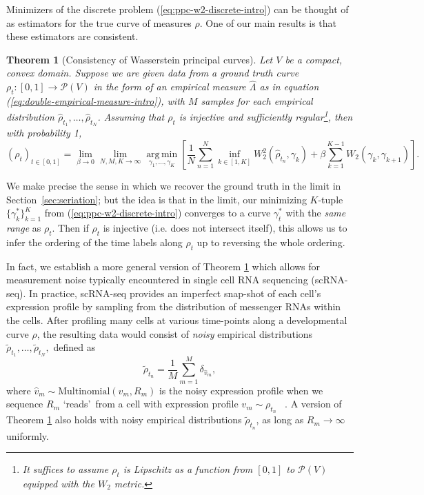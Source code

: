 \documentclass[aos, preprint]{imsart}
\theoremstyle{plain}
\newtheorem{theorem}{Theorem}[section]
\theoremstyle{remark}
\DeclareMathOperator*{\argmin}{arg\,min}
\begin{document}
Minimizers of the discrete problem (\ref{eq:ppc-w2-discrete-intro}) can be thought of as estimators for the true curve of measures $\rho$.
One of our main results is that these estimators are consistent.
\begin{theorem}[Consistency of Wasserstein principal curves]
\label{thm:main-intro}
Let $V$ be a compact, convex domain. Suppose we are given data from a ground truth curve $\rho_t:[0,1]\rightarrow \mathcal{P}(V)$ in the form of an empirical measure $\hat{\Lambda}$ as in equation (\ref{eq:double-empirical-measure-intro}), with $M$ samples for each empirical distribution $\hat \rho_{t_1},\ldots,\hat\rho_{t_N}$. Assuming that $\rho_t$ is injective and sufficiently regular\footnote{It suffices to assume $\rho_t$ is Lipschitz as a function from $[0,1]$ to $\mathcal{P}(V)$ equipped with the $W_2$ metric.}, then with probability 1,
\[
(\rho_t)_{t\in[0,1]}=\lim_{\beta\rightarrow 0}
\lim_{N,M,K \to \infty}\underset{\gamma_1,\ldots,\gamma_K}{\argmin}
\left[\frac{1}{N}\sum_{n=1}^N\inf_{k\in[1,K]}W_2^{2}(\hat{\rho}_{t_n},\gamma_{k})+\beta\sum_{k=1}^{K-1}{W_2}(\gamma_{k},\gamma_{k+1})\right].
\]
\end{theorem}

We make precise the sense in which we recover the ground truth in the limit in Section~\ref{sec:seriation}; but the idea is that in the limit, our minimizing $K$-tuple $\{\gamma^*_{k}\}_{k=1}^K$ from (\ref{eq:ppc-w2-discrete-intro}) converges to a curve $\gamma^*_t$ with the \emph{same range} as $\rho_t$. Then if $\rho_t$ is injective (i.e. does not intersect itself), this allows us to infer the ordering of the time labels along $\rho_t$ up to reversing the whole ordering.

In fact, we establish a more general version of Theorem \ref{thm:main-intro} which allows for measurement noise typically encountered in single cell RNA sequencing (scRNA-seq).
In practice, scRNA-seq provides an imperfect snap-shot of each cell's expression profile by sampling from the distribution of messenger RNAs within the cells.
After profiling many cells at various time-points along a developmental curve $\rho$, the resulting data would consist of {\em noisy} empirical distributions $\tilde \rho_{t_1}, \ldots, \tilde \rho_{t_N},$
defined as
\begin{equation}
  \tilde \rho_{t_n} = \frac{1}{M} \sum_{m=1}^{M}
  \delta_{\hat v_m},
  \label{eq:noisy_empirical}
\end{equation}
where $\hat v_m \sim \text{Multinomial}(v_m,R_m)$ is the noisy expression profile when we sequence $R_m$ \lq reads\rq~from a cell with expression profile $v_{m}\sim \rho_{t_n}$ ~\cite{kim2024optimal}.
A version of Theorem \ref{thm:main-intro} also holds with noisy empirical distributions $\tilde \rho_{t_n}$, as long as $R_m \to \infty$ uniformly.
\end{document}
